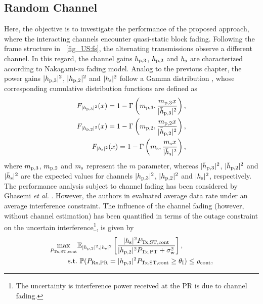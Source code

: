 \subsection{Random Channel}\label{ssec_US:ltpa}
Here, the objective is to investigate the performance of the proposed approach, where the interacting channels encounter quasi-static block fading. Following the frame structure in \figurename~\ref{fig_US:fs}, the alternating transmissions observe a different channel. In this regard, the channel gains $h_{\text{p,3}}$, $h_{\text{p,2}}$ and $h_{\text{s}}$ are characterized according to Nakagami-$m$ fading model. Analog to the previous chapter, the power gains $|h_{\text{p,3}}|^2$, $|h_{\text{p,2}}|^2$ and $|h_{\text{s}}|^2$ follow a Gamma distribution \cite{Goldsmith05}, whose corresponding cumulative distribution functions are defined as  
\begin{align}
F_{|h_{\text{p,3}}|^2}(x) = 1 - \Gamma\left(m_{\text{p,3}}, \frac{m_{\text{p,3}} x}{|\bar{h}_{\text{p,3}}|^2}\right), \label{eq_US:dis_pgpth}\\
F_{|h_{\text{p,2}}|^2}(x) = 1 - \Gamma\left(m_{\text{p,2}}, \frac{m_{\text{p,2}} x}{|\bar{h}_{\text{p,2}}|^2}\right), \label{eq_US:dis_pgpt}\\  
F_{|h_{\text{s}}|^2}(x) = 1 - \Gamma\left(m_{\text{s}} , \frac{m_{\text{s}} x}{|\bar{h}_{\text{s}}|^2}\right), \label{eq_US:dis_pgs}
\end{align}
where $m_{\text{p,3}}$, $m_{\text{p,2}}$ and $m_{\text{s}}$ represent the $m$ parameter, whereas $|\bar{h}_{\text{p,3}}|^2$, $|\bar{h}_{\text{p,2}}|^2$ and $|\bar{h}_{\text{s}}|^2$ are the expected values for channels $|h_{\text{p,3}}|^2$, $|h_{\text{p,2}}|^2$ and $|h_{\text{s}}|^2$, respectively. %
The performance analysis subject to channel fading has been considered by Ghasemi \textit{et al.} \cite{Ghasemi06, Ghasemi07}. However, the authors in \cite{Ghasemi06, Ghasemi07} evaluated average data rate under an average interference constraint. The influence of the channel fading (however, without channel estimation) has been quantified in terms of the outage constraint on the uncertain interference\footnote{The uncertainty is interference power received at the PR is due to channel fading.}, is given by %
\begin{align}
	\max_{P_{\text{Tx,ST,cont}}} & {\mathbb E}_{|h_{\text{p,2}}|^2, |h_{\text{s}}|^2 }\left[  \frac{|h_{\text{s}}|^2 P_{\text{Tx,ST,cont}}}{|h_{\text{p,2}}|^2 P_{\text{Tx,PT}} + \sigma^2_{\text{w}}} \right] \label{eq_US:sys_id_fad}, \\
	\text{s.t.} & \text{ } \mathbb P(P_{\text{Rx,PR}}= |h_{\text{p,3}}|^2 P_{\text{Tx,ST,cont}} \ge \theta_{\text{I}}) \le \rho_{\text{cont}}, \label{eq_US:opc_id_fad} 
\end{align}

